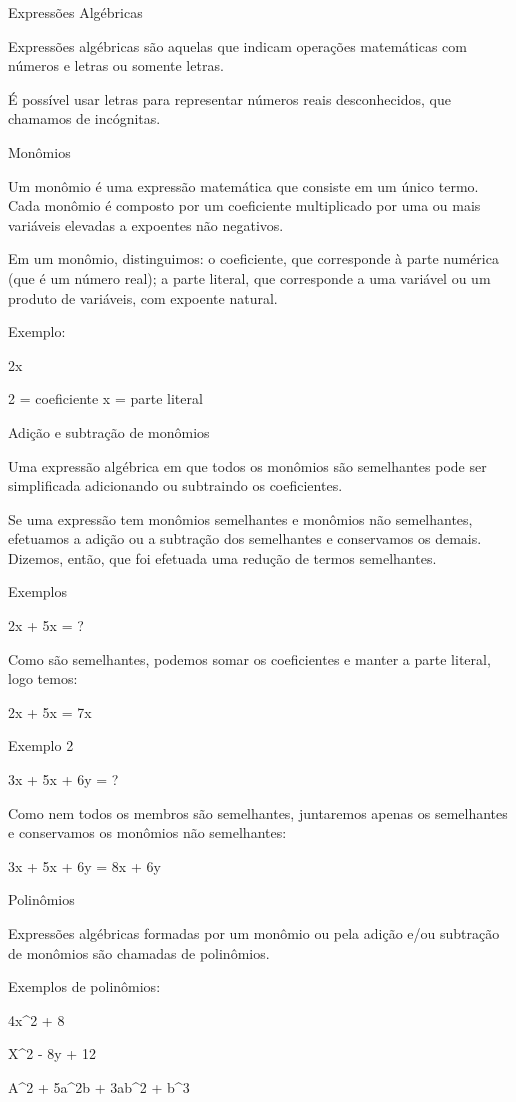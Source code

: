 {Expressões Algébricas

Expressões algébricas são aquelas que indicam operações matemáticas com
números e letras ou somente letras.

É possível usar letras para representar números reais desconhecidos, que
chamamos de incógnitas.

Monômios

Um monômio é uma expressão matemática que consiste em um único termo.
Cada monômio é composto por um coeficiente multiplicado por uma ou mais
variáveis elevadas a expoentes não negativos.

Em um monômio, distinguimos: o coeficiente, que corresponde à parte
numérica (que é um número real); a parte literal, que corresponde a uma
variável ou um produto de variáveis, com expoente natural.

Exemplo:

2x

2 = coeficiente x = parte literal

Adição e subtração de monômios

Uma expressão algébrica em que todos os monômios são semelhantes pode
ser simplificada adicionando ou subtraindo os coeficientes.

Se uma expressão tem monômios semelhantes e monômios não semelhantes,
efetuamos a adição ou a subtração dos semelhantes e conservamos os
demais. Dizemos, então, que foi efetuada uma redução de termos
semelhantes.

Exemplos

2x + 5x = ?

Como são semelhantes, podemos somar os coeficientes e manter a parte
literal, logo temos:

2x + 5x = 7x

Exemplo 2

3x + 5x + 6y = ?

Como nem todos os membros são semelhantes, juntaremos apenas os
semelhantes e conservamos os monômios não semelhantes:

3x + 5x + 6y = 8x + 6y

Polinômios

Expressões algébricas formadas por um monômio ou pela adição e/ou
subtração de monômios são chamadas de polinômios.

Exemplos de polinômios:

4x^2 + 8

X^2 - 8y + 12

A^2 + 5a^2b + 3ab^2 + b^3

}
